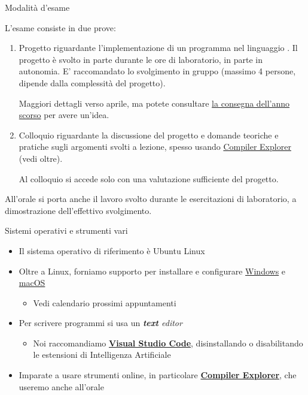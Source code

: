 \begin{frame}{Modalità d'esame}

  L'esame consiste in due prove:

  \begin{enumerate}

  \item Progetto riguardante l'implementazione di un programma nel linguaggio
    \Cpp{}. Il progetto è svolto in parte durante le ore di laboratorio, in
    parte in autonomia. E' raccomandato lo svolgimento in gruppo (massimo 4
    persone, dipende dalla complessità del progetto).

    Maggiori dettagli verso aprile, ma potete consultare
    \href{https://github.com/Programmazione-per-la-Fisica/progetto2024}{la
      consegna dell'anno scorso} per avere un'idea.

  \item Colloquio riguardante la discussione del progetto e domande
    teoriche e pratiche sugli argomenti svolti a lezione, spesso
    usando \href{https://godbolt.org/}{Compiler Explorer} (vedi oltre).

    Al colloquio si accede solo con una valutazione sufficiente del progetto.

  \end{enumerate}

  All'orale si porta anche il lavoro svolto durante le esercitazioni di
  laboratorio, a dimostrazione dell'effettivo svolgimento.

\end{frame}

\begin{frame}{Sistemi operativi e strumenti vari}
  \begin{itemize}[<+->]
  \item Il sistema operativo di riferimento è Ubuntu Linux
  \item Oltre a Linux, forniamo supporto per installare e configurare
    \href{https://github.com/Programmazione-per-la-Fisica/howto/blob/main/other-OSes/WSLGuide.md}{Windows}
    e
    \href{https://github.com/Programmazione-per-la-Fisica/howto/blob/main/other-OSes/macOSGuide.md}{macOS}
      \begin{itemize}[<.->]
      \item Vedi calendario prossimi appuntamenti
      \end{itemize}
  \item Per scrivere programmi si usa un \textit{\textbf{text} editor}
    \begin{itemize}[<.->]
    \item Noi raccomandiamo \href{https://code.visualstudio.com/}{\textbf{Visual
          Studio Code}}, disinstallando o disabilitando le estensioni di
          Intelligenza Artificiale
    \end{itemize}
  \item Imparate a usare strumenti online, in particolare
    \href{https://godbolt.org/}{\textbf{Compiler Explorer}}, che
    useremo anche all'orale
  \end{itemize}

\end{frame}

